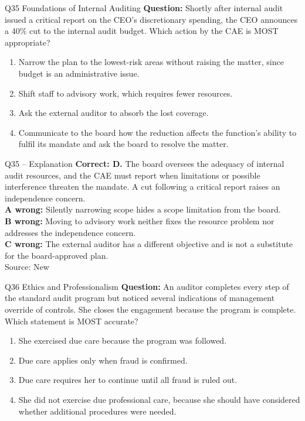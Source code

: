 \documentclass[aspectratio=169,10pt]{beamer}
\begin{document}
\begin{frame}[t]{Q35 \hfill {\scriptsize Foundations of Internal Auditing}}
	\small
	\textbf{Question:} Shortly after internal audit issued a critical report on the CEO's discretionary spending, the CEO announces a 40\% cut to the internal audit budget. Which action by the CAE is MOST appropriate?
	\begin{enumerate}[label=\Alph*.,itemsep=1pt,topsep=3pt]
			\item Narrow the plan to the lowest-risk areas without raising the matter, since budget is an administrative issue.
			\item Shift staff to advisory work, which requires fewer resources.
			\item Ask the external auditor to absorb the lost coverage.
			\item Communicate to the board how the reduction affects the function's ability to fulfil its mandate and ask the board to resolve the matter.
	\end{enumerate}
\end{frame}

\begin{frame}[t]{Q35 -- Explanation}
	\footnotesize
	\textbf{Correct: D.} The board oversees the adequacy of internal audit resources, and the CAE must report when limitations or possible interference threaten the mandate. A cut following a critical report raises an independence concern. \\[5pt]
\textbf{A wrong:} Silently narrowing scope hides a scope limitation from the board. \\[3pt]
\textbf{B wrong:} Moving to advisory work neither fixes the resource problem nor addresses the independence concern. \\[3pt]
\textbf{C wrong:} The external auditor has a different objective and is not a substitute for the board-approved plan. \\[3pt]
	\vfill {\tiny Source: New}
\end{frame}

\begin{frame}[t]{Q36 \hfill {\scriptsize Ethics and Professionalism}}
	\small
	\textbf{Question:} An auditor completes every step of the standard audit program but noticed several indications of management override of controls. She closes the engagement because the program is complete. Which statement is MOST accurate?
	\begin{enumerate}[label=\Alph*.,itemsep=1pt,topsep=3pt]
			\item She exercised due care because the program was followed.
			\item Due care applies only when fraud is confirmed.
			\item Due care requires her to continue until all fraud is ruled out.
			\item She did not exercise due professional care, because she should have considered whether additional procedures were needed.
	\end{enumerate}
\end{frame}
\end{document}
